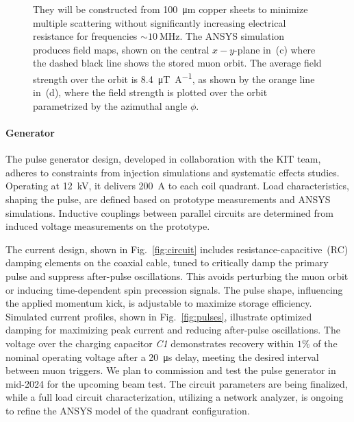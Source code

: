 \begin{refsection}
\begin{figure}
{            They will be constructed from \SI{100}{\micro m} copper sheets to minimize multiple scattering without significantly increasing electrical resistance for frequencies $\sim \SI{10}{\mega\hertz}$.
            The ANSYS simulation produces field maps, shown on the central $x-y$-plane in~(c) where the dashed black line shows the stored muon orbit. 
            The average field strength over the orbit is \SI{8.4}{\micro\tesla\per\ampere}, as shown by the orange line in~(d), where the field strength is plotted over the orbit parametrized by the azimuthal angle $\phi$.}
        \label{fig:coils}
        \end{figure}
        
        \paragraph{Generator}
        The pulse generator design, developed in collaboration with the KIT team, adheres to constraints from injection simulations and systematic effects studies. 
        Operating at \SI{12}{kV}, it delivers \SI{200}{A} to each coil quadrant. 
        Load characteristics, shaping the pulse, are defined based on prototype measurements and ANSYS simulations. 
        Inductive couplings between parallel circuits are determined from induced voltage measurements on the prototype.
        
        The current design, shown in Fig.~\ref{fig:circuit} includes resistance-capacitive~(RC) damping elements on the coaxial cable, tuned to critically damp the primary pulse and suppress after-pulse oscillations. 
        This avoids perturbing the muon orbit or inducing time-dependent spin precession signals. 
        The pulse shape, influencing the applied momentum kick, is adjustable to maximize storage efficiency. 
        Simulated current profiles, shown in Fig.~\ref{fig:pulses}, illustrate optimized damping for maximizing peak current and reducing after-pulse oscillations. 
        The voltage over the charging capacitor \textit{C1} demonstrates recovery within $1\%$ of the nominal operating voltage after a \SI{20}{\micro s} delay, meeting the desired interval between muon triggers.
        We plan to commission and test the pulse generator in mid-2024 for the upcoming beam test. 
        The circuit parameters are being finalized, while a full load circuit characterization, utilizing a network analyzer, is ongoing to refine the ANSYS model of the quadrant configuration.
            

\end{refsection}

